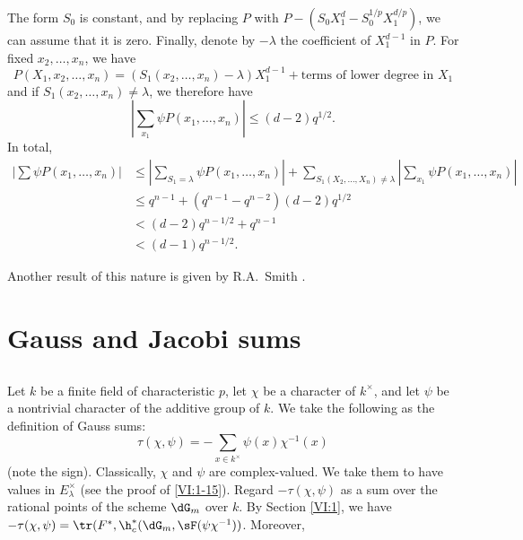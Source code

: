\documentclass[oneside]{book}
\begin{document}
The form $S_0$ is constant, and by replacing $P$ with 
$P-(S_0 X_1^d -S_0^{1/p} X_1^{d/p})$, we can assume that it is zero. 
Finally, denote by $-\lambda$ the coefficient of $X_1^{d-1}$ in $P$. For fixed 
$x_2,\dots,x_n$, we have 
\[
  P(X_1,x_2,\dots,x_n) = (S_1(x_2,\dots,x_n)-\lambda) X_1^{d-1} + \text{terms of lower degree in $X_1$} 
\]
and if $S_1(x_2,\dots,x_n)\ne \lambda$, we therefore have 
\[
  \left| \sum_{x_1} \psi P(x_1,\dots,x_n)\right| \leqslant (d-2) q^{1/2} \text{.} 
\]
In total, 
\begin{align*}
  \left|\sum \psi P(x_1,\dots,x_n)\right| 
    &\leqslant \left|\sum_{S_1=\lambda} \psi P(x_1,\dots,x_n)\right| + \sum_{S_1(X_2,\dots,X_n)\ne\lambda} \left| \sum_{x_1} \psi P(x_1,\dots,x_n)\right| \\
    &\leqslant q^{n-1} + (q^{n-1}-q^{n-2})(d-2) q^{1/2} \\
    &< (d-2) q^{n-1/2} + q^{n-1} \\
    &< (d-1) q^{n-1/2} \text{.}
\end{align*}

Another result of this nature is given by R.A.\ Smith 
\cite{sm70}. 










\section{Gauss and Jacobi sums}\label{VI:4}





\subsection{}\label{VI:4-1}

Let $k$ be a finite field of characteristic $p$, let $\chi$ be a character of 
$k^\times$, and let $\psi$ be a nontrivial character of the additive group of $k$. 
We take the following as the definition of Gauss sums: 
\begin{equation*}\tag{4.1.1}\label{VI:eq:4-1-1}
  \tau(\chi,\psi) = -\sum_{x\in k^\times} \psi(x) \chi^{-1}(x) 
\end{equation*}
(note the sign). Classically, $\chi$ and $\psi$ are complex-valued. 
We take them to have values in $E_\lambda^\times$ (see the proof of 
\ref{VI:1-15}). Regard $-\tau(\chi,\psi)$ as a sum over the rational 
points of the scheme $\dG_m$ over $k$. By Section \ref{VI:1}, 
we have $-\tau(\chi,\psi) = \tr(F^\ast,\h_c^\ast(\dG_m,\sF(\psi \chi^{-1}))$. Moreover,
\end{document}
